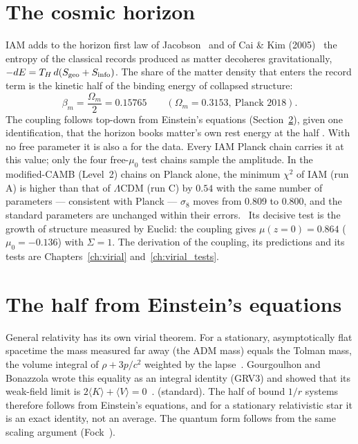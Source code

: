 \section{The cosmic horizon}\label{sec:vl_cosmic}
IAM adds to the horizon first law of Jacobson~\cite{Jacobson1995} and of Cai \& Kim (2005)~\cite{CaiKim2005} the
entropy of the classical records produced as matter decoheres gravitationally, $-dE=T_H\,d(S_{\rm geo}+S_{\rm info})$. The share of the matter density that
enters the record term is the kinetic half of the binding energy of collapsed structure:
\begin{equation}
\beta_m=\frac{\Omega_m}{2}=0.15765\qquad(\Omega_m=0.3153,\ \text{Planck 2018}).\label{eq:vl_beta}
\end{equation}
\derived{} The coupling follows top-down from Einstein's equations (Section~\ref{sec:vl_gr}), given one identification, that the horizon books matter's own rest energy at the half \interp. With no free parameter it is also a \prediction{} for the data. Every IAM Planck chain carries it at this value; only the four free-$\mu_0$ test chains sample the amplitude. In the modified-CAMB (Level~2) chains on
Planck alone, the minimum $\chi^2$ of IAM (run A) is higher than that of $\Lambda$CDM (run C) by $0.54$ with the same number of parameters --- consistent with Planck --- $\sigma_8$
moves from 0.809 to 0.800, and the standard parameters are unchanged within their errors. \measured\ Its decisive test is the growth of structure measured
by Euclid: the coupling gives $\mu(z{=}0)=0.864$ ($\mu_0=-0.136$) with $\Sigma=1$. The derivation of the coupling, its predictions and its tests are
Chapters~\ref{ch:virial} and~\ref{ch:virial_tests}.

\section{The half from Einstein's equations}\label{sec:vl_gr}
General relativity has its own virial theorem. For a stationary, asymptotically flat spacetime the mass measured far away (the ADM mass) equals the
Tolman mass, the volume integral of $\rho+3p/c^2$ weighted by the lapse~\cite{Tolman1930}. Gourgoulhon and Bonazzola wrote this equality as an
integral identity (GRV3) and showed that its weak-field limit is $2\langle K\rangle+\langle V\rangle=0$~\cite{GourgoulhonBonazzola1994}. \derived{}
(standard). The half of bound $1/r$ systems therefore follows from Einstein's equations, and for a stationary relativistic star it is an exact
identity, not an average. The quantum form follows from the same scaling argument (Fock~\cite{Fock1930}). \derived

